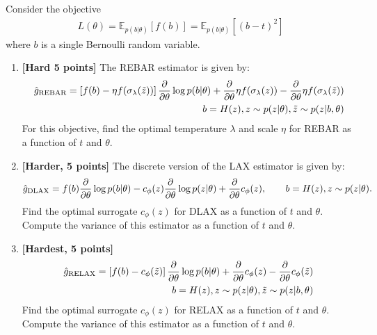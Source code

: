 \documentclass{harvardml}
\newcommand{\E}{\mathbb{E}}
\newcommand{\PT}{\frac{\partial}{\partial \theta}}
\newcommand{\LAX}{{\textnormal{LAX}}}
\newcommand{\DLAX}{{\textnormal{DLAX}}}
\theoremstyle{plain}
\begin{document}









\begin{problem}

Consider the objective
%
\begin{align}
L(\theta) 
= \E_{p(b|\theta)} \left[ f(b) \right]
= \E_{p(b|\theta)} \left[ (b - t)^2 \right]
\end{align}
%
where $b$ is a single Bernoulli random variable.


\begin{enumerate}[label=(\alph*)]
\item {\bf [Hard 5 points]} The REBAR estimator is given by:
\begin{align}
\hat g_\textnormal{REBAR} = \left[ f(b) - \eta f(\sigma_\lambda(\tilde{z})) \right] \PT \log p(b|\theta) + \PT \eta f(\sigma_\lambda(z)) - \PT \eta f(\sigma_\lambda(\tilde{z})) \\
\qquad b = H(z), z \sim p(z|\theta), \tilde{z} \sim p(z|b, \theta) \nonumber
\end{align}
%
For this objective, find the optimal temperature $\lambda$ and scale $\eta$ for REBAR as a function of $t$ and $\theta$.
\item {\bf [Harder, 5 points]} The discrete version of the \LAX{} estimator is given by:
%
\begin{align}
\label{eq:discrete lax}
\hat g_\DLAX = f(b) \PT \log p(b|\theta) - c_\phi(z) \PT \log p(z|\theta) + \PT c_\phi(z), \qquad b = H(z), z \sim p(z|\theta).
\end{align}
%
Find the optimal surrogate $c_\phi(z)$ for DLAX as a function of $t$ and $\theta$.
Compute the variance of this estimator as a function of $t$ and $\theta$.
\item {\bf [Hardest, 5 points]} %
\begin{align}
\hat g_\textnormal{RELAX} = \left[ f(b) - c_\phi(\tilde{z}) \right] \PT \log p(b|\theta) + \PT c_\phi(z) - \PT c_\phi (\tilde{z}) \\
\qquad b = H(z), z \sim p(z|\theta), \tilde{z} \sim p(z|b, \theta) \nonumber
\end{align}
%
Find the optimal surrogate $c_\phi(z)$ for RELAX as a function of $t$ and $\theta$.
Compute the variance of this estimator as a function of $t$ and $\theta$.
\end{enumerate}
\end{problem}
\end{document}
